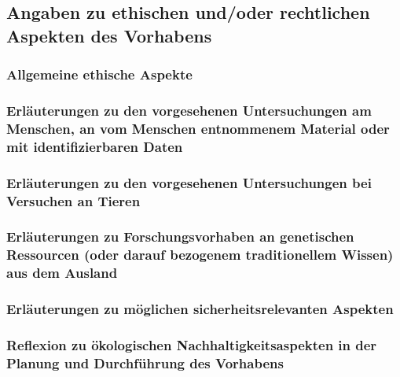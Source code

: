 \documentclass[ngerman]{scrartcl}
\begin{document}
\subsection{Angaben zu ethischen und/oder rechtlichen Aspekten des Vorhabens}

\subsubsection{Allgemeine ethische Aspekte}

\subsubsection{Erläuterungen zu den vorgesehenen Untersuchungen am Menschen, an vom Menschen entnommenem Material oder mit identifizierbaren Daten}

\subsubsection{Erläuterungen zu den vorgesehenen Untersuchungen bei Versuchen an Tieren}

\subsubsection{Erläuterungen zu Forschungsvorhaben an genetischen Ressourcen (oder darauf bezogenem traditionellem Wissen) aus dem Ausland}

\subsubsection{Erläuterungen zu möglichen sicherheitsrelevanten Aspekten}



\subsubsection{Reflexion zu ökologischen Nachhaltigkeitsaspekten in der Planung und Durchführung des Vorhabens}

\end{document}
